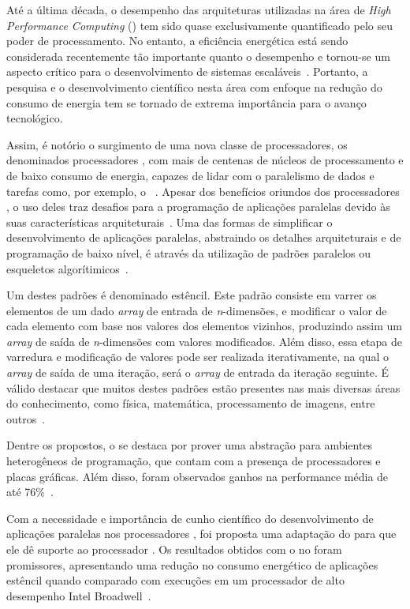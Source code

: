 Até a última década, o desempenho das arquiteturas utilizadas na área de \textit{High Performance Computing} (\hpc) tem sido quase exclusivamente quantificado pelo seu poder de processamento. No entanto, a eficiência energética está sendo considerada recentemente tão importante quanto o desempenho e tornou-se um aspecto crítico para o desenvolvimento de sistemas escaláveis~\cite{francesquini:hal-01092325}. Portanto, a pesquisa e o desenvolvimento científico nesta área com enfoque na redução do consumo de energia tem se tornado de extrema importância para o avanço tecnológico.

Assim, é notório o surgimento de uma nova classe de processadores, os denominados processadores \manycore, com mais de centenas de núcleos de processamento e de baixo consumo de energia, capazes de lidar com o paralelismo de dados e tarefas como, por exemplo, o \mppa~\cite{castro2013}. 
Apesar dos benefícios oriundos dos processadores \manycore, o uso deles traz desafios para a programação de aplicações paralelas devido às suas características arquiteturais~\cite{castro:hal-01273153}. Uma das formas de simplificar o desenvolvimento de aplicações paralelas, abstraindo os detalhes arquiteturais e de programação de baixo nível, é através da utilização de padrões paralelos ou esqueletos algorítimicos~\cite{COLE2004389}.

Um destes padrões é denominado estêncil. Este padrão consiste em varrer os elementos de um dado \textit{array} de entrada de \textit{n}-dimensões, e modificar o valor de cada elemento com base nos valores dos elementos vizinhos, produzindo assim um \textit{array} de saída de \textit{n}-dimensões com valores modificados. Além disso, essa etapa de varredura e modificação de valores pode ser realizada iterativamente, na qual o \textit{array} de saída de uma iteração, será o \textit{array} de entrada da iteração seguinte. É válido destacar que muitos destes padrões estão presentes nas mais diversas áreas do conhecimento, como física, matemática, processamento de imagens, entre outros~\cite{Holewinski:2012:HCG:2304576.2304619}.

Dentre os \fws propostos, o \pskel se destaca por prover uma abstração para ambientes heterogêneos de programação, que contam com a presença de processadores \multicore e placas gráficas. Além disso, foram observados ganhos na performance média de até 76\%~\cite{CPE:CPE3479}.

Com a necessidade e importância de cunho científico do desenvolvimento de aplicações paralelas nos processadores \manycore, foi proposta uma adaptação do \fw \pskel para que ele dê suporte ao processador \mppa. Os resultados obtidos com o \pskel no \mppa foram promissores, apresentando uma redução no consumo energético de aplicações estêncil quando comparado  com execuções em um processador de alto desempenho Intel Broadwell~\cite{wscad2017}.

